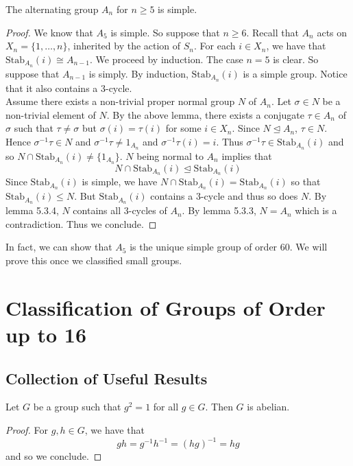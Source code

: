 \documentclass[a4paper]{article}
\begin{document}
\begin{thm}{}{} The alternating group $A_n$ for $n\geq 5$ is simple. 
\begin{proof}
We know that $A_5$ is simple. So suppose that $n\geq 6$. Recall that $A_n$ acts on $X_n=\{1,\dots,n\}$, inherited by the action of $S_n$. For each $i\in X_n$, we have that $\text{Stab}_{A_n}(i)\cong A_{n-1}$. We proceed by induction. The case $n=5$ is clear. So suppose that $A_{n-1}$ is simply. By induction, $\text{Stab}_{A_n}(i)$ is a simple group. Notice that it also contains a $3$-cycle. \\

Assume there exists a non-trivial proper normal group $N$ of $A_n$. Let $\sigma\in N$ be a non-trivial element of $N$. By the above lemma, there exists a conjugate $\tau\in A_n$ of $\sigma$ such that $\tau\neq\sigma$ but $\sigma(i)=\tau(i)$ for some $i\in X_n$. Since $N\trianglelefteq A_n$, $\tau\in N$. Hence $\sigma^{-1}\tau\in N$ and $\sigma^{-1}\tau\neq 1_{A_n}$ and $\sigma^{-1}\tau(i)=i$. Thus $\sigma^{-1}\tau\in\text{Stab}_{A_n}(i)$ and so $N\cap\text{Stab}_{A_n}(i)\neq\{1_{A_n}\}$. $N$ being normal to $A_n$ implies that $$N\cap\text{Stab}_{A_n}(i)\trianglelefteq\text{Stab}_{A_n}(i)$$ Since $\text{Stab}_{A_n}(i)$ is simple, we have $N\cap\text{Stab}_{A_n}(i)=\text{Stab}_{A_n}(i)$ so that $\text{Stab}_{A_n}(i)\leq N$. But $\text{Stab}_{A_n}(i)$ contains a $3$-cycle and thus so does $N$. By lemma 5.3.4, $N$ contains all $3$-cycles of $A_n$. By lemma 5.3.3, $N=A_n$ which is a contradiction. Thus we conclude. 
\end{proof}
\end{thm}

In fact, we can show that $A_5$ is the unique simple group of order $60$. We will prove this once we classified small groups. 

\pagebreak
\section{Classification of Groups of Order up to 16}
\subsection{Collection of Useful Results}
\begin{lmm}{}{} Let $G$ be a group such that $g^2=1$ for all $g\in G$. Then $G$ is abelian. 
\begin{proof}
For $g,h\in G$, we have that $$gh=g^{-1}h^{-1}=(hg)^{-1}=hg$$ and so we conclude. 
\end{proof}
\end{lmm}
\end{document}
